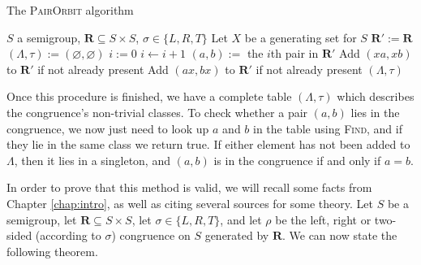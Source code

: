 \begin{algorithm}
\caption{The \textsc{PairOrbit} algorithm}
\label{alg:p}
\begin{algorithmic}[1]
\Require $S$ a semigroup,
         $\mathbf{R} \subseteq S \times S$,
         $\sigma \in \{L, R, T\}$
\State Let $X$ be a generating set for $S$
\State $\mathbf{R}' := \mathbf{R}$
\State $(\Lambda, \tau) := (\varnothing, \varnothing)$
\State $i := 0$  
\Repeat
  \State $i \gets i + 1$
  \State $(a,b) :=$ the $i$th pair in $\mathbf{R}'$
    \State {}
  \EndIf
    \State {}
  \EndIf
  \State {}
      \State Add $(xa, xb)$ to $\mathbf{R}'$ if not already present
    \EndIf
      \State Add $(ax, bx)$ to $\mathbf{R}'$ if not already present
    \EndIf
  \EndFor
{}  
\State \Return $(\Lambda, \tau)$
\EndProcedure
\end{algorithmic}
\end{algorithm}

Once this procedure is finished, we have a complete table $(\Lambda,\tau)$ which describes
the congruence's non-trivial classes.  To check whether a pair $(a,b)$ lies in
the congruence, we now just need to look up $a$ and $b$ in the table using
\textsc{Find}, and if they lie in the same class we return true.  If either
element has not been added to $\Lambda$, then it lies in a singleton, and $(a,b)$
is in the congruence if and only if $a=b$.

In order to prove that this method is valid, we will recall some facts from
Chapter \ref{chap:intro}, as well as citing several sources for some theory.
Let $S$ be a semigroup, let $\mathbf{R} \subseteq S \times S$, let
$\sigma \in \{L, R, T\}$, and let $\rho$ be the left, right or two-sided
(according to $\sigma$) congruence on $S$ generated by $\mathbf{R}$.  We can now
state the following theorem.

